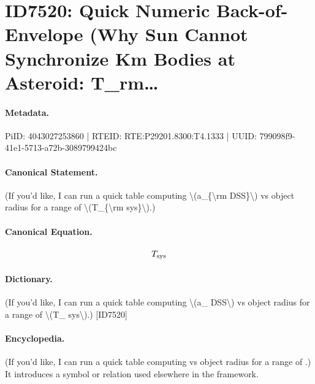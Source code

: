 \section*{ID7520: Quick Numeric Back-of-Envelope (Why Sun Cannot Synchronize Km Bodies at Asteroid: T\_rm…}
\paragraph{Metadata.}
PiID: 4043027253860 | RTEID: RTE:P29201.8300:T4.1333 | UUID: 799098f9-41e1-5713-a72b-3089799424bc

\paragraph{Canonical Statement.}
(If you’d like, I can run a quick table computing \textbackslash{}(a\_\{\textbackslash{}rm DSS\}\textbackslash{}) vs object radius for a range of \textbackslash{}(T\_\{\textbackslash{}rm sys\}\textbackslash{}).)

\paragraph{Canonical Equation.}
\[
T_{\rm sys}
\]

\paragraph{Dictionary.}
(If you’d like, I can run a quick table computing \textbackslash{}(a\_ DSS\textbackslash{}) vs object radius for a range of \textbackslash{}(T\_ sys\textbackslash{}).) [ID7520]

\paragraph{Encyclopedia.}
(If you’d like, I can run a quick table computing vs object radius for a range of .) It introduces a symbol or relation used elsewhere in the framework.
